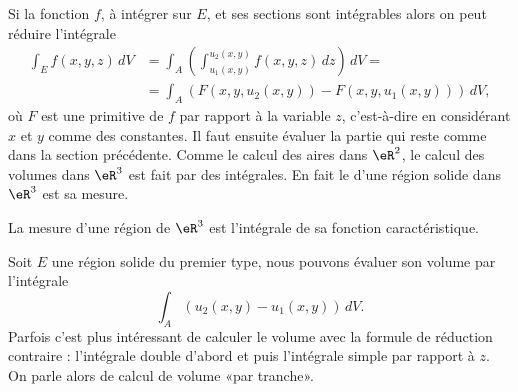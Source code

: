Si la fonction $f$, à intégrer sur $E$, et ses sections sont intégrables  alors on peut réduire l'intégrale
\begin{equation}
  \begin{aligned}
     \int_E  f(x,y,z)\, dV&=\int_A\left(\int_{u_1(x,y)}^{u_2(x,y)}f(x,y,z)\, dz \right) \, dV=\\
&=\int_A\left(F(x,y,u_2(x,y))-F(x,y,u_1(x,y))\right)\, dV,
  \end{aligned}
\end{equation}
où $F$ est une primitive de $f$ par rapport à la variable $z$, c'est-à-dire en considérant $x$ et $y$ comme des constantes. Il faut ensuite évaluer la partie qui reste comme dans la section précédente. Comme le calcul des aires dans $\eR^2$, le calcul des volumes dans $\eR^3$ est fait par des intégrales. En fait le  d'une région solide dans $\eR^3$ est sa mesure.
\begin{definition}
   La mesure d'une région de  $\eR^3$ est l'intégrale de sa fonction caractéristique.
\end{definition}
Soit $E$ une région solide du premier type, nous pouvons évaluer son volume par l'intégrale
\[
\int_A\left(u_2(x,y)-u_1(x,y)\right)\, dV.
\]
Parfois c'est plus intéressant de calculer le volume avec la formule de réduction contraire : l'intégrale double d'abord et puis l'intégrale simple par rapport à $z$. On parle alors de calcul de volume «par tranche».

